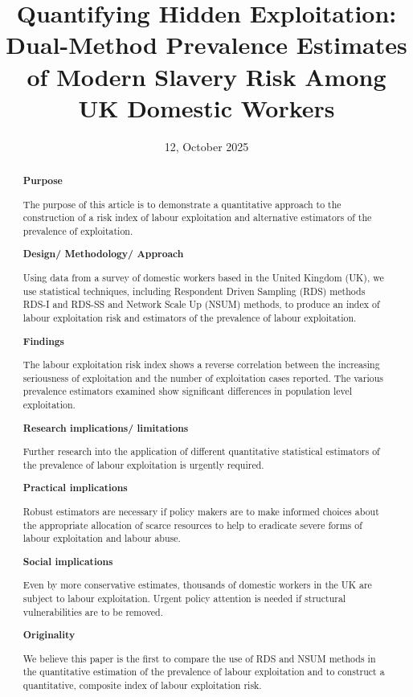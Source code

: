 \documentclass[
  12pt,
  letterpaper,
  DIV=11,
  numbers=noendperiod]{scrartcl}
\title{Quantifying Hidden Exploitation: Dual-Method Prevalence Estimates
of Modern Slavery Risk Among UK Domestic Workers}
\author{}
\date{12, October 2025}
\theoremstyle{plain}
\theoremstyle{definition}
\begin{document}
\maketitle
\begin{abstract}
\textbf{Purpose}

The purpose of this article is to demonstrate a quantitative approach to
the construction of a risk index of labour exploitation and alternative
estimators of the prevalence of exploitation.

\textbf{Design/ Methodology/ Approach}

Using data from a survey of domestic workers based in the United Kingdom
(UK), we use statistical techniques, including Respondent Driven
Sampling (RDS) methods RDS-I and RDS-SS and Network Scale Up (NSUM)
methods, to produce an index of labour exploitation risk and estimators
of the prevalence of labour exploitation.

\textbf{Findings}

The labour exploitation risk index shows a reverse correlation between
the increasing seriousness of exploitation and the number of
exploitation cases reported. The various prevalence estimators examined
show significant differences in population level exploitation.

\textbf{Research implications/ limitations}

Further research into the application of different quantitative
statistical estimators of the prevalence of labour exploitation is
urgently required.

\textbf{Practical implications}

Robust estimators are necessary if policy makers are to make informed
choices about the appropriate allocation of scarce resources to help to
eradicate severe forms of labour exploitation and labour abuse.

\textbf{Social implications}

Even by more conservative estimates, thousands of domestic workers in
the UK are subject to labour exploitation. Urgent policy attention is
needed if structural vulnerabilities are to be removed.

\textbf{Originality}

We believe this paper is the first to compare the use of RDS and NSUM
methods in the quantitative estimation of the prevalence of labour
exploitation and to construct a quantitative, composite index of labour
exploitation risk.
\end{abstract}
\end{document}
